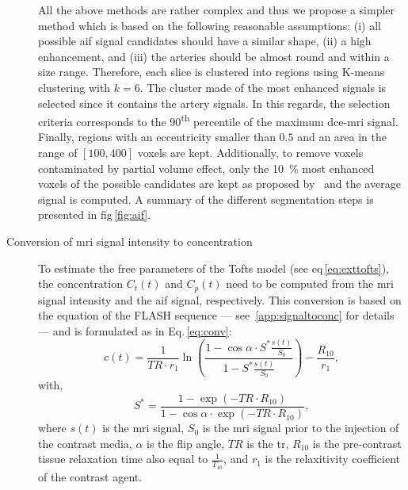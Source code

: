 \begin{description}
    All the above methods are rather complex and thus we propose a simpler method which is based on the following reasonable assumptions:
    (i) all possible \ac{aif} signal candidates should have a similar shape,
    (ii) a high enhancement, and
    (iii) the arteries should be almost round and within a size range.
    Therefore, each slice is clustered into regions using K-means clustering with $k=6$.
    The cluster made of the most enhanced signals is selected since it contains the artery signals.
    In this regards, the selection criteria corresponds to the 90\textsuperscript{th} percentile of the maximum \ac{dce}-\ac{mri} signal.
    Finally, regions with an eccentricity smaller than $0.5$ and an area in the range of $[100, 400]$ voxels are kept.
    Additionally, to remove voxels contaminated by partial volume effect, only the \SI{10}{\percent} most enhanced voxels of the possible candidates are kept as proposed by~\cite{schabel2008uncertainty} and the average signal is computed.
    A summary of the different segmentation steps is presented in \acs{fig}\,\ref{fig:aif}.
    \item[Conversion of \ac{mri} signal intensity to concentration] To estimate the free parameters of the Tofts model (see \acs{eq}\,\eqref{eq:exttofts}), the concentration $C_t(t)$ and $C_p(t)$ need to be computed from the \ac{mri} signal intensity and the \ac{aif} signal, respectively.
      This conversion is based on the equation of the FLASH sequence --- see~\ref{app:signaltoconc} for details --- and is formulated as in Eq.\,\eqref{eq:conv}:
      \begin{equation}
        c(t) = \frac{1}{TR \cdot r_1} \ln\left( \frac{1 - \cos \alpha \cdot S^{*}\frac{s(t)}{S_0}}{1 - S^{*}\frac{s(t)}{S_0}} \right) - \frac{R_{10}}{r_1} ,
        \label{eq:conv}
      \end{equation}
      \noindent with,
      \begin{equation}
        S^{*} = \frac{1 - \exp(- TR \cdot R_{10})}{1 - \cos \alpha \cdot \exp(- TR \cdot R_{10})} ,
        \label{eq:sstarconv}
      \end{equation}
      \noindent where $s(t)$ is the \ac{mri} signal, $S_0$ is the \ac{mri} signal prior to the injection of the contrast media, $\alpha$ is the flip angle, $TR$ is the \acf{tr}, $R_{10}$ is the pre-contrast tissue relaxation time also equal to $\frac{1}{T_{10}}$, and $r_1$ is the relaxitivity coefficient of the contrast agent.


\end{description}
